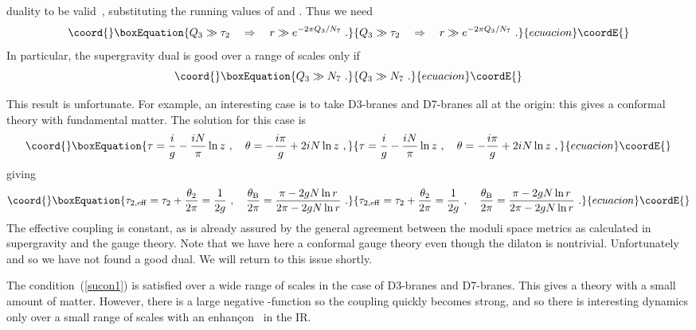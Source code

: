 \documentclass[a4paper,12pt]{article}
\renewcommand{\=}[1]{\bar{#1}}
\begin{document}
duality to be valid~\cite{maldacena}, substituting the running values of \coordHE{} and
\myHighlight{$\tau$}\coordHE{}.  Thus we need
\begin{equation}\coord{}\boxEquation{
Q_3 \gg \tau_2 \quad \Rightarrow \quad r \gg e^{-2\pi Q_3/N_7}\ .\label{sucon1}
}{
Q_3 \gg \tau_2 \quad \Rightarrow \quad r \gg e^{-2\pi Q_3/N_7}\ .}{ecuacion}\coordE{}\end{equation}
In particular, the supergravity dual is good over a range of scales only if
\begin{equation}\coord{}\boxEquation{
Q_3 \gg N_7\ .  \label{sucon2}
}{
Q_3 \gg N_7\ .  }{ecuacion}\coordE{}\end{equation}

This result is unfortunate.  For example, an interesting case is to take \coordHE{}
D3\myHighlight{$^+$}\coordHE{}-branes and \coordHE{} D7\myHighlight{$^+$}\coordHE{}-branes all at the origin: this gives a conformal
\coordHE{}  \coordHE{} theory with fundamental matter.  The solution for this case is
\begin{equation}\coord{}\boxEquation{
\tau = \frac{i}{g} - \frac{iN}{\pi} \ln z\ , \quad
\theta = -\frac{i\pi}{g} + 2iN\ln z\ , \label{consol}
}{
\tau = \frac{i}{g} - \frac{iN}{\pi} \ln z\ , \quad
\theta = -\frac{i\pi}{g} + 2iN\ln z\ , }{ecuacion}\coordE{}\end{equation}
giving
\begin{equation}\coord{}\boxEquation{
\tau_{2,\rm eff} = \tau_2 + \frac{\theta_2}{2\pi} = \frac{1}{2g}\ , \quad
\frac{\theta_{\rm B}}{2\pi} = \frac{\pi - 2gN \ln r}{2\pi - 2gN \ln r}\ .
}{
\tau_{2,\rm eff} = \tau_2 + \frac{\theta_2}{2\pi} = \frac{1}{2g}\ , \quad
\frac{\theta_{\rm B}}{2\pi} = \frac{\pi - 2gN \ln r}{2\pi - 2gN \ln r}\ .
}{ecuacion}\coordE{}\end{equation}
The effective coupling is constant, as is already assured by the general
agreement between the moduli space metrics as calculated in supergravity and the
gauge theory.  Note that we have here a conformal gauge theory even
though the dilaton is nontrivial.  Unfortunately \coordHE{}
and so we have not found a good dual.  We will return to this issue shortly.

The condition~(\ref{sucon1}) is satisfied over a wide range of scales in the
case of
\coordHE{} D3\myHighlight{$^+$}\coordHE{}-branes and \coordHE{} D7\myHighlight{$^+$}\coordHE{}-branes.  This gives a \coordHE{}  \coordHE{}
theory with a small amount of matter.  However, there is a large negative
\myHighlight{$\beta$}\coordHE{}-function so the coupling quickly becomes strong, and so there is
interesting dynamics only over a small range of scales with an
enhan\c con~\cite{enhan} in the IR.
\end{document}
